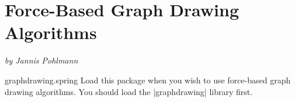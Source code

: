 %
%
%

\section{Force-Based Graph Drawing Algorithms}
\label{section-library-graphdrawing-force-based}

{\emph{by Jannis Pohlmann}}


\begin{tikzlibrary}{graphdrawing.spring}
  Load this package when you wish to use force-based graph drawing
  algorithms. You should load the |graphdrawing| library first.
\end{tikzlibrary}

\ifluatex\relax{}\expandafter\endinput\fi


\subsection{Overview}


...

\begin{key}{/graph drawing/spring layout=\meta{options}}
  \keyalias{tikz}\keyalias{tikz/graphs}
  Similar to the |>| option, this ``generic'' name for a spring layout
  algorithm is not hardwired to any specific algorithm. Rather, users
  can select an algorithm somewhere at the beginning of their program
  and then just write |\graph[spring layout]| to draw a tree.

  The \meta{options} will be forwarded to the currently selected
  algorithm.
\begin{codeexample}[]
\tikz \graph [spring layout] { a -> {b,c} };    
\end{codeexample}
  
  To change the algorithm, change the following key:
  \begin{key}{/graph drawing/spring layout/default algorithm=\meta{algorithm}}
    Set this key to the tree drawing algorithm of your choice. The
    default is currently set to the algorithm
    |standard spring electrical|, but this will change. 
  \end{key}
\end{key}



